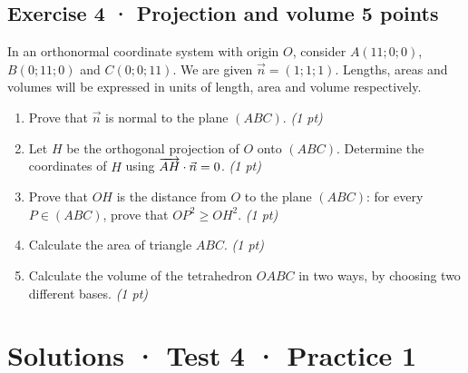 \subsection*{Exercise 4 · Projection and volume \hfill 5 points}In an orthonormal coordinate system with origin $O$, consider $A(11;0;0)$, $B(0;11;0)$ and $C(0;0;11)$. We are given $\vec n=(1;1;1)$. Lengths, areas and volumes will be expressed in units of length, area and volume respectively.

\begin{enumerate}

\item Prove that $\vec n$ is normal to the plane $(ABC)$. \hfill\textit{(1 pt)}

\item Let $H$ be the orthogonal projection of $O$ onto $(ABC)$. Determine the coordinates of $H$ using $\overrightarrow{AH}\cdot\vec n=0$. \hfill\textit{(1 pt)}

\item Prove that $OH$ is the distance from $O$ to the plane $(ABC)$: for every $P\in(ABC)$, prove that $OP^2\ge OH^2$. \hfill\textit{(1 pt)}

\item Calculate the area of triangle $ABC$. \hfill\textit{(1 pt)}

\item Calculate the volume of the tetrahedron $OABC$ in two ways, by choosing two different bases. \hfill\textit{(1 pt)}

\end{enumerate}

\ifprof\clearpage

\section*{Solutions · Test 4 · Practice 1}\label{cor:6-1}

